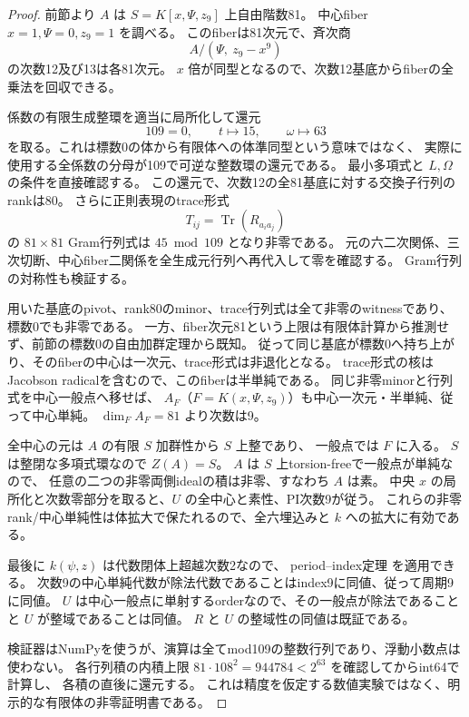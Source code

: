 \begin{proof}
前節より $A$ は $S=K[x,\Psi,z_9]$ 上自由階数81。
中心fiber $x=1,\Psi=0,z_9=1$ を調べる。
このfiberは81次元で、斉次商
\[
 A/(\Psi,\ z_9-x^9)
\]
の次数12及び13は各81次元。
$x$ 倍が同型となるので、次数12基底からfiberの全乗法を回収できる。

係数の有限生成整環を適当に局所化して還元
\[
 109=0,\qquad t\mapsto15,\qquad\omega\mapsto63
\]
を取る。これは標数0の体から有限体への体準同型という意味ではなく、
実際に使用する全係数の分母が109で可逆な整数環の還元である。
最小多項式と $L,\Omega$ の条件を直接確認する。
この還元で、次数12の全81基底に対する交換子行列のrankは80。
さらに正則表現のtrace形式
\[
 T_{ij}=\operatorname{Tr}(R_{a_i a_j})
\]
の $81\times81$ Gram行列式は $45\bmod109$ となり非零である。
元の六二次関係、三次切断、中心fiber二関係を全生成元行列へ再代入して零を確認する。
Gram行列の対称性も検証する。

用いた基底のpivot、rank80のminor、trace行列式は全て非零のwitnessであり、
標数0でも非零である。
一方、fiber次元81という上限は有限体計算から推測せず、前節の標数0の自由加群定理から既知。
従って同じ基底が標数0へ持ち上がり、そのfiberの中心は一次元、trace形式は非退化となる。
trace形式の核はJacobson radicalを含むので、このfiberは半単純である。
同じ非零minorと行列式を中心一般点へ移せば、
$A_F$（$F=K(x,\Psi,z_9)$）も中心一次元・半単純、従って中心単純。
$\dim_F A_F=81$ より次数は9。

全中心の元は $A$ の有限 $S$ 加群性から $S$ 上整であり、
一般点では $F$ に入る。
$S$ は整閉な多項式環なので $Z(A)=S$。
$A$ は $S$ 上torsion-freeで一般点が単純なので、
任意の二つの非零両側idealの積は非零、すなわち $A$ は素。
中央 $x$ の局所化と次数零部分を取ると、$U$ の全中心と素性、PI次数9が従う。
これらの非零rank/中心単純性は体拡大で保たれるので、全六埋込みと $k$ への拡大に有効である。

最後に $k(\psi,z)$ は代数閉体上超越次数2なので、
period--index定理 \cite[Theorem~4.2.2.3]{LieblichPeriodIndex}を適用できる。
次数9の中心単純代数が除法代数であることはindex9に同値、従って周期9に同値。
$U$ は中心一般点に単射するorderなので、その一般点が除法であることと $U$ が整域であることは同値。
$R$ と $U$ の整域性の同値は既証である。

検証器はNumPyを使うが、演算は全てmod109の整数行列であり、浮動小数点は使わない。
各行列積の内積上限 $81\cdot108^2=944784<2^{63}$ を確認してからint64で計算し、
各積の直後に還元する。
これは精度を仮定する数値実験ではなく、明示的な有限体の非零証明書である。
\end{proof}
